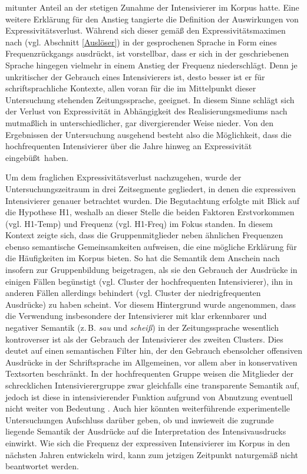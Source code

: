 mitunter Anteil an der stetigen Zunahme der Intensivierer im Korpus hatte. Eine weitere Erklärung für den Anstieg tangierte die Definition der Auswirkungen von Expressivitätsverlust. Während sich dieser gemäß den Expressivitätsmaximen nach \mbox{\citet[]{Kirschbaum.2002b}} (vgl. Abschnitt \ref{Auslöser}) in der gesprochenen Sprache in Form eines Frequenzrückgangs ausdrückt, ist vorstellbar, dass er sich in der geschriebenen Sprache hingegen vielmehr in einem Anstieg der Frequenz niederschlägt. Denn je unkritischer der Gebrauch eines Intensivierers ist, desto besser ist er für schriftsprachliche Kontexte, allen voran für die im Mittelpunkt dieser Untersuchung stehenden Zeitungssprache, geeignet. In diesem Sinne schlägt sich der Verlust von Expressivität in Abhängigkeit des Realisierungsmediums nach \mbox{\citet[]{Koch.1996,Koch.2007}} mutmaßlich in unterschiedlicher, gar divergierender Weise nieder. Von den Ergebnissen der Untersuchung ausgehend besteht also die Möglichkeit, dass die hochfrequenten Intensivierer über die Jahre hinweg an Expressivität \mbox{eingebüßt haben}.

Um dem fraglichen Expressivitätsverlust nachzugehen, wurde der Untersuchungszeitraum in drei Zeitsegmente gegliedert, in denen die expressiven Intensivierer genauer betrachtet wurden. Die Begutachtung erfolgte mit Blick auf die Hypothese H1, weshalb an dieser Stelle die beiden Faktoren Erstvorkommen (vgl. H1-Temp) und Frequenz (vgl. H1-Freq) im Fokus standen. In diesem Kontext zeigte sich, dass die Gruppenmitglieder neben ähnlichen Frequenzen ebenso semantische Gemeinsamkeiten aufweisen, die eine mögliche Erklärung für die Häufigkeiten im Korpus bieten. So hat die Semantik dem Anschein nach insofern zur Gruppenbildung beigetragen, als sie den Gebrauch der Ausdrücke in einigen Fällen begünstigt (vgl. Cluster der hochfrequenten Intensivierer), ihn in anderen Fällen allerdings behindert (vgl. Cluster der niedrigfrequenten Ausdrücke) zu haben scheint. Vor diesem Hintergrund wurde angenommen, dass die Verwendung insbesondere der Intensivierer mit klar erkennbarer und negativer Semantik (z.\,B. \textit{sau} und \textit{scheiß}) in der Zeitungssprache wesentlich kontroverser ist als der Gebrauch der Intensivierer des zweiten Clusters. Dies deutet auf einen semantischen Filter hin, der den Gebrauch ebensolcher offensiven Ausdrücke in der Schriftsprache im Allgemeinen, vor allem aber in konservativen Textsorten beschränkt. In der hochfrequenten Gruppe weisen die Mitglieder der \glqq{}schrecklichen\grqq{} Intensivierergruppe zwar gleichfalls eine transparente Semantik auf, jedoch ist diese in intensivierender Funktion aufgrund von Abnutzung eventuell nicht weiter von Bedeutung \citep[vgl.][15f.]{Nouwen.2020}. Auch hier könnten weiterführende experimentelle Untersuchungen Aufschluss darüber geben, ob und inwieweit die zugrunde liegende Semantik der Ausdrücke auf die Interpretation des Intensivausdrucks einwirkt. Wie sich die Frequenz der expressiven Intensivierer im Korpus in den nächsten Jahren entwickeln wird, kann zum jetzigen Zeitpunkt naturgemäß nicht beantwortet werden.

